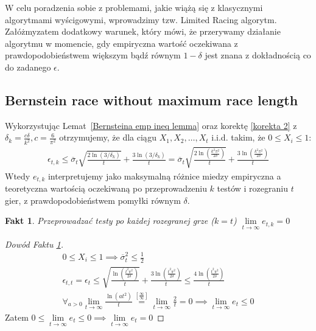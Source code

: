 \documentclass[inzynierska]{pwr_wmat_praca_dyplomowa}
\theoremstyle{plain}
\numberwithin{theorem}{chapter}
\newtheorem{fact}[theorem]{Fakt}
\theoremstyle{definition}
\numberwithin{theorem}{chapter}
\begin{document}
	W celu poradzenia sobie z problemami, jakie wiążą się z klasycznymi algorytmami wyścigowymi, wprowadzimy  tzw. Limited Racing algorytm. Załóżmyzatem dodatkowy warunek, który mówi, że przerywamy działanie algorytmu w momencie, gdy empiryczna wartość oczekiwana z prawdopodobieństwem większym bądź równym $1-\delta$ jest znana z dokładnością co do zadanego $\epsilon$.
	\subsection{Bernstein race without maximum race length}
	Wykorzystując Lemat~\ref{Bernsteina emp ineq lemma} oraz korektę \ref{korekta 2} z $\delta_k=\frac{c\delta}{k^2}, c=\frac{6}{\pi^2}$ otrzymujemy, że dla ciągu $X_1,X_2,\dots,X_t$ i.i.d. takim, że  $0 \le X_i \le 1$:
	\begin{align*}
		\label{Bernstein race without maximum race length}
		\epsilon_{t,k} \le \overline{\sigma}_t \sqrt{\frac{2\ln(3/\delta_k)}{t}} + \frac{3  \ln{(3 / \delta_k)}}{t} =
		\overline{\sigma}_t\sqrt{\frac{2\ln(\frac{k^2\pi^2}{2\delta})}{t}} + \frac{3  \ln{(\frac{k^2\pi^2}{2\delta})}}{t}
	\end{align*}
	Wtedy $e_{t,k}$ interpretujemy jako maksymalną różnice miedzy empiryczna a teoretyczna wartością oczekiwaną po przeprowadzeniu $k$ testów i rozegraniu $t$ gier, z prawdopodobieństwem pomyłki równym $\delta$.
	\begin{fact}
		\label{Fakt Bernstein race without maximum race length}
		Przeprowadzać testy po każdej rozegranej grze ($k=t$)  $\lim\limits_{t\to\infty} e_{t,k} = 0$ 
	\end{fact}

	\begin{proof}[Dowód Faktu \ref{Fakt Bernstein race without maximum race length}]
		\begin{gather*}
		0\le X_i \le 1 \implies \overline{\sigma}_t^2 \le \frac{1}{2}\\
		\epsilon_{t,t} =\epsilon_t \le  \sqrt{\frac{\ln(\frac{t^2\pi^2}{2\delta})}{t}} + \frac{3  \ln{(\frac{t^2\pi^2}{2\delta})}}{t} \le \frac{4  \ln{(\frac{t^2\pi^2}{2\delta})}}{t}\\
		\forall_{a>0} \lim\limits_{t\to\infty} \frac{\ln(at^2)}{t} \overset{\left[\frac{\infty}{\infty}\right]}{=}\lim\limits_{t\to\infty} \frac{2}{t}=0 \implies
		\lim\limits_{t\to\infty} e_t \le 0 
		\end{gather*}
	Zatem $0\le \lim\limits_{t\to\infty} e_t \le 0 \implies \lim\limits_{t\to\infty} e_t = 0$
	\end{proof}
	
\end{document}
